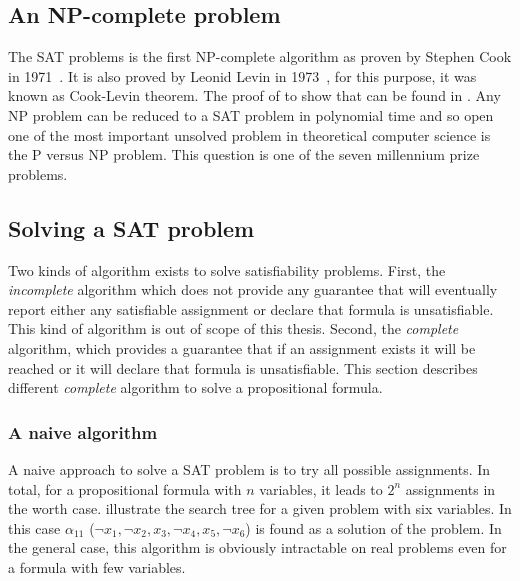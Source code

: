 \subsection{An NP-complete problem}

The SAT problems is the first NP-complete algorithm as proven by Stephen Cook in 1971~\cite{cook1971complexity}.
It is also proved by Leonid Levin in 1973~\cite{4640789}, for this purpose, it was known as Cook-Levin theorem.
The proof of to show that can be found in \cite{sipser2006introduction}.
Any NP problem can be reduced to a SAT problem in polynomial time and so open one of the most important 
unsolved problem in theoretical computer science is the P versus NP problem.
This question is one of the seven millennium prize problems.


%
%


\subsection{Solving a SAT problem}

Two kinds of algorithm exists to solve satisfiability problems.
First, the \emph{incomplete} algorithm which does not provide any guarantee that will eventually report either any satisfiable assignment or declare that formula is unsatisfiable. This kind of algorithm is out of scope of this thesis. 
Second, the \emph{complete} algorithm, which provides a guarantee that if an assignment exists
it will be reached or it will declare that formula is unsatisfiable.
This section describes different \emph{complete }algorithm to solve a propositional formula.



\subsubsection{A naive algorithm}
A naive approach to solve a SAT problem is to try all possible assignments. In total,
for a propositional formula with $n$ variables, it leads to $2^n$ assignments in the worth case.  
 illustrate the search tree for a given problem with six variables.
In this case $\alpha_{11}$ ($\neg x_1, \neg x_2, x_3, \neg x_4, x_5, \neg x_6 $) is found as a solution of the problem. In the general case,
this algorithm is obviously intractable on real problems even for a formula with few variables.


